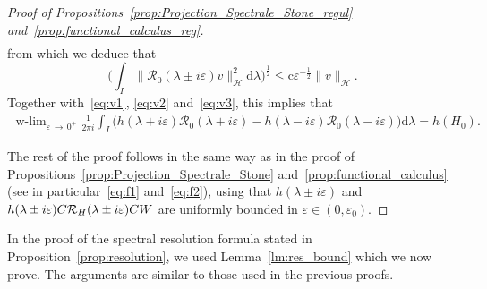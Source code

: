 \documentclass[AHL,Unicode,longabstracts,published]{cedram}
\newcommand{\Hi}{\mathcal{H}}
\newcommand{\rmc}{\mathrm{c}}
\newcommand{\rmd}{\mathrm{d}}
\newcommand{\Res}{\mathcal{R}}
\DeclareMathOperator{\wlim}{w-lim}
\newcommand{\Hi}{\mathcal{H}}
\begin{document}
\begin{proof}[Proof of Propositions~\ref{prop:Projection_Spectrale_Stone_regul} and~\ref{prop:functional_calculus_reg}]
\begin{equation}
\begin{split}
\end{split}
\end{equation}
from which we deduce that
\begin{equation}\label{eq:int_res_bound}
\Big(\int_I\big\|\Res_{0}(\lambda\pm i\varepsilon)v\big\|_\Hi^2\rmd \lambda\Big)^{\frac12}\le \rmc\varepsilon^{-\frac12}\|v\|_\Hi.
\end{equation}
Together with~\eqref{eq:v1}, \eqref{eq:v2} and~\eqref{eq:v3}, this implies that
\begin{align*}
\wlim_{\varepsilon\,\rightarrow\,0^+}\frac{1}{2\pi i}\int_I\big(h(\lambda+i\varepsilon)\Res_{0}(\lambda+i\varepsilon)-h(\lambda-i\varepsilon)\Res_{0}(\lambda-i\varepsilon)\big)\rmd \lambda=h(H_0).
\end{align*}

The rest of the proof follows in the same way as in the proof of Propositions~\ref{prop:Projection_Spectrale_Stone} and~\ref{prop:functional_calculus} (see in particular~\eqref{eq:f1} and~\eqref{eq:f2}), using that $h(\lambda\pm i\varepsilon)$ and $h(\lambda\pm i\varepsilon)C\Res_H\linebreak(\lambda\pm i\varepsilon)CW$ are uniformly bounded in $\varepsilon\in(0,\varepsilon_0)$.
\end{proof}

In the proof of the spectral resolution formula stated in Proposition~\ref{prop:resolution}, we used Lemma~\ref{lm:res_bound} which we now prove. The arguments are similar to those used in the previous proofs.
\end{document}
